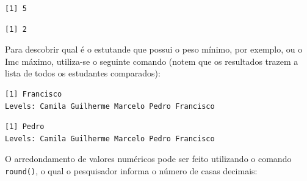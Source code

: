 \documentclass[12pt,brazil,oneside]{book}
\newenvironment{Shaded}{\begin{snugshade}}{\end{snugshade}}
\newcommand{\CommentTok}[1]{\textcolor[rgb]{0.56,0.35,0.01}{\textit{#1}}}
\newcommand{\DecValTok}[1]{\textcolor[rgb]{0.00,0.00,0.81}{#1}}
\newcommand{\KeywordTok}[1]{\textcolor[rgb]{0.13,0.29,0.53}{\textbf{#1}}}
\newcommand{\NormalTok}[1]{#1}
\newcommand{\OperatorTok}[1]{\textcolor[rgb]{0.81,0.36,0.00}{\textbf{#1}}}
\begin{document}
\begin{verbatim}
[1] 5
\end{verbatim}

\begin{Shaded}
\end{Shaded}

\begin{verbatim}
[1] 2
\end{verbatim}

Para descobrir qual é o estutande que possui o peso mínimo, por exemplo,
ou o Imc máximo, utiliza-se o seguinte comando (notem que os resultados
trazem a lista de todos os estudantes comparados):

\begin{Shaded}
\end{Shaded}

\begin{verbatim}
[1] Francisco
Levels: Camila Guilherme Marcelo Pedro Francisco
\end{verbatim}

\begin{Shaded}
\end{Shaded}

\begin{verbatim}
[1] Pedro
Levels: Camila Guilherme Marcelo Pedro Francisco
\end{verbatim}

O arredondamento de valores numéricos pode ser feito utilizando o
comando \texttt{round()}, o qual o pesquisador informa o número de casas
decimais:

\begin{Shaded}
\end{Shaded}
\end{document}
